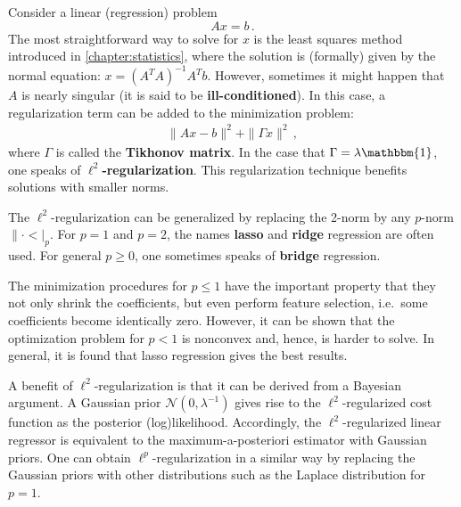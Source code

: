     \begin{method}{
        Consider a linear (regression) problem \[Ax = b\,.\] The most straightforward way to solve for $x$ is the least squares method introduced in \cref{chapter:statistics}, where the solution is (formally) given by the normal equation: $x=(A^TA)^{-1}A^Tb$. However, sometimes it might happen that $A$ is nearly singular (it is said to be \textbf{ill-conditioned}). In this case, a regularization term can be added to the minimization problem:
        \begin{gather}
            \|Ax-b\|^2+\|\Gamma x\|^2\,,
        \end{gather}
        where $\Gamma$ is called the \textbf{Tikhonov matrix}. In the case that $\Gamma=\lambda\mathbbm{1}$, one speaks of \textbf{$\ell^2$-regularization}. This regularization technique benefits solutions with smaller norms.
    }
    \end{method}
    \begin{remark}
        The $\ell^2$-regularization can be generalized by replacing the 2-norm by any $p$-norm $\|\cdot<|_p$. For $p=1$ and $p=2$, the names \textbf{lasso} and \textbf{ridge} regression are often used. For general $p\geq0$, one sometimes speaks of \textbf{bridge} regression.

        The minimization procedures for $p\leq1$ have the important property that they not only shrink the coefficients, but even perform feature selection, i.e.~some coefficients become identically zero. However, it can be shown that the optimization problem for $p<1$ is nonconvex and, hence, is harder to solve. In general, it is found that lasso regression gives the best results.

        A benefit of $\ell^2$-regularization is that it can be derived from a Bayesian argument. A Gaussian prior $\mathcal{N}(0,\lambda^{-1})$ gives rise to the $\ell^2$-regularized cost function as the posterior (log)likelihood. Accordingly, the $\ell^2$-regularized linear regressor is equivalent to the maximum-a-posteriori estimator with Gaussian priors. One can obtain $\ell^p$-regularization in a similar way by replacing the Gaussian priors with other distributions such as the Laplace distribution for $p=1$.
    \end{remark}

